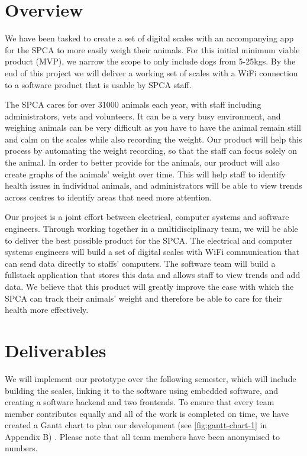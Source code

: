 
\chapter{Overview}

We have been tasked to create a set of digital scales with an accompanying app for the SPCA to more easily weigh their animals. For this initial minimum viable product (MVP), we narrow the scope to only include dogs from 5-25kgs. By the end of this project we will deliver a working set of scales with a WiFi connection to a software product that is usable by SPCA staff. 

The SPCA cares for over 31000 animals each year, with staff including administrators, vets and volunteers. It can be a very busy environment, and weighing animals can be very difficult as you have to have the animal remain still and calm on the scales while also recording the weight. Our product will help this process by automating the weight recording, so that the staff can focus solely on the animal. In order to better provide for the animals, our product will also create graphs of the animals’ weight over time. This will help staff to identify health issues in individual animals, and administrators will be able to view trends across centres to identify areas that need more attention. 

Our project is a joint effort between electrical, computer systems and software engineers. Through working together in a multidisciplinary team, we will be able to deliver the best possible product for the SPCA. The electrical and computer systems engineers will build a set of digital scales with WiFi communication that can send data directly to staffs’ computers. The software team will build a fullstack application that stores this data and allows staff to view trends and add data. We believe that this product will greatly improve the ease with which the SPCA can track their animals’ weight and therefore be able to care for their health more effectively.


\chapter{Deliverables}


We will implement our prototype over the following semester, which will include building the scales, linking it to the software using embedded software, and creating a software backend and two frontends. To ensure that every team member contributes equally and all of the work is completed on time, we have created a Gantt chart to plan our development (see \ref{fig:gantt-chart-1} in Appendix B) . Please note that all team members have been anonymised to numbers. 

